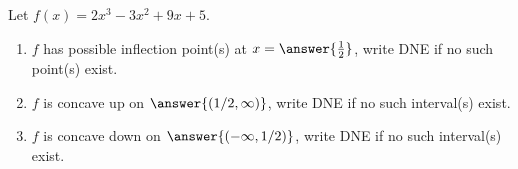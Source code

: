 \documentclass{ximera}
\author{Gregory Hartman \and Matthew Carr}
\begin{document}
\begin{exercise}




Let $f(x)=2x^3-3x^2+9x+5$. 
\begin{enumerate}
\item		$f$ has possible inflection point(s) at $x=\answer{\frac{1}{2}}$, write DNE if no such point(s) exist.
\item		$f$ is concave up on $\answer{(1/2,\infty)}$, write DNE if no such interval(s) exist.
\item		$f$ is concave down on $\answer{(-\infty,1/2)}$, write DNE if no such interval(s) exist.
\end{enumerate}

\end{exercise}
\end{document}
